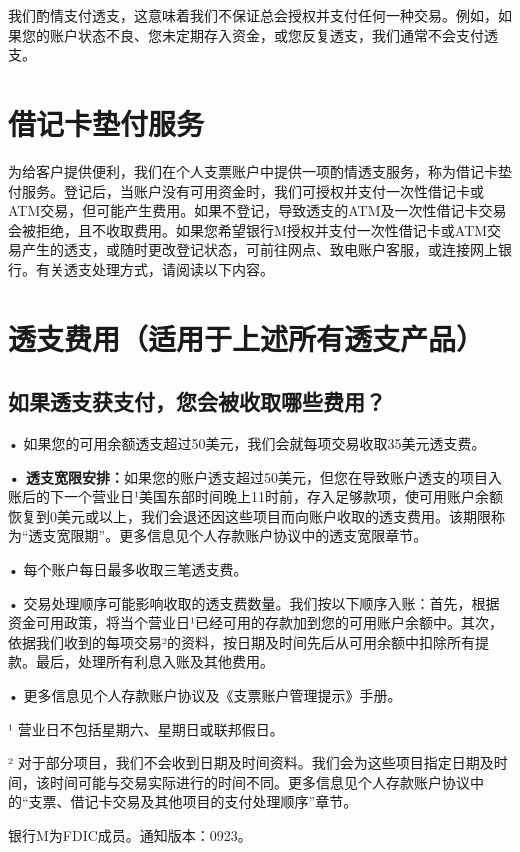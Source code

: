 \documentclass[UTF8,fontset=none,11pt,a4paper]{ctexart}
\begin{document}
我们酌情支付透支，这意味着我们不保证总会授权并支付任何一种交易。例如，如果您的账户状态不良、您未定期存入资金，或您反复透支，我们通常不会支付透支。


\section*{借记卡垫付服务}
为给客户提供便利，我们在个人支票账户中提供一项酌情透支服务，称为借记卡垫付服务。登记后，当账户没有可用资金时，我们可授权并支付一次性借记卡或ATM交易，但可能产生费用。如果不登记，导致透支的ATM及一次性借记卡交易会被拒绝，且不收取费用。如果您希望银行M授权并支付一次性借记卡或ATM交易产生的透支，或随时更改登记状态，可前往网点、致电账户客服，或连接网上银行。有关透支处理方式，请阅读以下内容。


\section*{透支费用（适用于上述所有透支产品）}
\subsection*{如果透支获支付，您会被收取哪些费用？}
• 如果您的可用余额透支超过50美元，我们会就每项交易收取35美元透支费。


\textbf{• 透支宽限安排：}如果您的账户透支超过50美元，但您在导致账户透支的项目入账后的下一个营业日¹美国东部时间晚上11时前，存入足够款项，使可用账户余额恢复到0美元或以上，我们会退还因这些项目而向账户收取的透支费用。该期限称为“透支宽限期”。更多信息见个人存款账户协议中的透支宽限章节。


• 每个账户每日最多收取三笔透支费。


• 交易处理顺序可能影响收取的透支费数量。我们按以下顺序入账：首先，根据资金可用政策，将当个营业日¹已经可用的存款加到您的可用账户余额中。其次，依据我们收到的每项交易²的资料，按日期及时间先后从可用余额中扣除所有提款。最后，处理所有利息入账及其他费用。


• 更多信息见个人存款账户协议及《支票账户管理提示》手册。


¹ 营业日不包括星期六、星期日或联邦假日。


² 对于部分项目，我们不会收到日期及时间资料。我们会为这些项目指定日期及时间，该时间可能与交易实际进行的时间不同。更多信息见个人存款账户协议中的“支票、借记卡交易及其他项目的支付处理顺序”章节。


银行M为FDIC成员。通知版本：0923。
\end{document}
